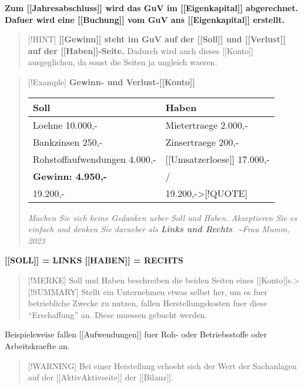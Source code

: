\textbf{Zum {[}{[}Jahresabschluss{]}{]} wird das GuV im
{[}{[}Eigenkapital{]}{]} abgerechnet. Dafuer wird eine
{[}{[}Buchung{]}{]} vom GuV ans {[}{[}Eigenkapital{]}{]} erstellt.}

\begin{quote}
{[}!HINT{]} \textbf{{[}{[}Gewinn{]}{]} steht im GuV auf der
{[}{[}Soll{]}{]} und {[}{[}Verlust{]}{]} auf der
{[}{[}Haben{]}{]}-Seite.} Dadurch wird auch dieses {[}{[}Konto{]}{]}
ausgeglichen, da sonst die Seiten ja ungleich waeren.
\end{quote}

\begin{quote}
{[}!Example{]} \textbf{Gewinn- und Verlust-{[}{[}Konto{]}{]}}

\begin{longtable}[]{@{}ll@{}}
\toprule\noalign{}
Soll & Haben \\
\midrule\noalign{}
\endhead
\bottomrule\noalign{}
\endlastfoot
Loehne 10.000,- & Mietertraege 2.000,- \\
Bankzinsen 250,- & Zinsertraege 200,- \\
Rohstoffaufwendungen 4.000,- & {[}{[}Umsatzerloese{]}{]} 17.000,- \\
\textbf{Gewinn: 4.950,-} & / \\
19.200,- & 19.200,-\textgreater{[}!QUOTE{]} \\
\end{longtable}

\emph{Machen Sie sich keine Gedanken ueber Soll und Haben. Akzeptieren
Sie es einfach und denken Sie darueber als \textbf{Links und Rechts}.
\textasciitilde Frau Mumm, 2023}
\end{quote}

\textbf{{[}{[}SOLL{]}{]} = LINKS} \textbf{{[}{[}HABEN{]}{]} = RECHTS}

\begin{quote}
{[}!MERKE{]} Soll und Haben beschreiben die beiden Seiten eines
{[}{[}Konto{]}{]}s.\textgreater{[}!SUMMARY{]} Stellt ein Unternehmen
etwas selbst her, um es fuer betriebliche Zwecke zu nutzen, fallen
Herstellungskosten fuer diese ``Erschaffung'' an. Diese muessen gebucht
werden.
\end{quote}

Beispielsweise fallen {[}{[}Aufwendungen{]}{]} fuer Roh- oder
Betriebsstoffe oder Arbeitskraefte an.

\begin{quote}
{[}!WARNING{]} Bei einer Herstellung erhoeht sich der Wert der
Sachanlagen auf der {[}{[}Aktiv\textbar Aktivseite{]}{]} der
{[}{[}Bilanz{]}{]}.
\end{quote}

